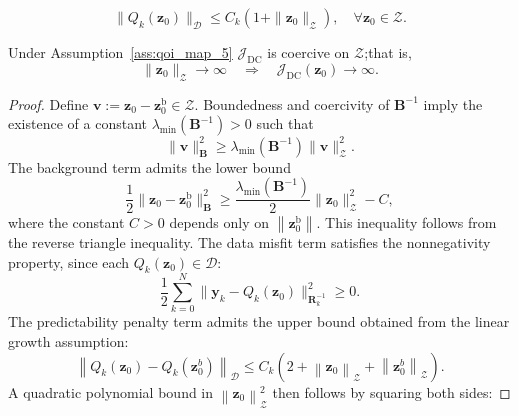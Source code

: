 \documentclass[10pt,a4paper]{amsart}
\begin{document}
\begin{equation}\label{ass:qoi_map_5}
\| Q_k(\mathbf{z}_0) \|_{\mathcal{D}} \leq C_k (1 + \| \mathbf{z}_0 \|_{\mathcal{Z}}), \quad \forall \mathbf{z}_0 \in \mathcal{Z}.
\end{equation}

\begin{lemma}\label{lemma:coercivity}
Under Assumption~\ref{ass:qoi_map_5} $\mathcal{J}_{\mathrm{DC}}$ is coercive on $\mathcal{Z}$;that is,
\begin{equation}
\| \mathbf{z}_0 \|_{\mathcal{Z}} \to \infty \quad \Rightarrow \quad \mathcal{J}_{\mathrm{DC}}(\mathbf{z}_0) \to \infty.
\end{equation}
\end{lemma}

\begin{proof}
Define $ \mathbf{v} := \mathbf{z}_0 - \mathbf{z}_0^{\mathrm{b}} \in \mathcal{Z} $. Boundedness and coercivity of $ \mathbf{B}^{-1} $ imply the existence of a constant $ \lambda_{\min}\left(\mathbf{B}^{-1}\right) > 0 $ such that
\begin{equation}
\| \mathbf{v} \|_{\mathbf{B}}^2 \geq \lambda_{\min}\left(\mathbf{B}^{-1}\right) \| \mathbf{v} \|_{\mathcal{Z}}^2.
\end{equation}
The background term admits the lower bound
\begin{equation}
\frac{1}{2} \| \mathbf{z}_0 - \mathbf{z}_0^{\mathrm{b}} \|_{\mathbf{B}}^2 \geq \frac{\lambda_{\min}\left(\mathbf{B}^{-1}\right)}{2} \| \mathbf{z}_0 \|_{\mathcal{Z}}^2 - C,
\end{equation}
where the constant $ C > 0 $ depends only on $ \left\| \mathbf{z}_0^{\mathrm{b}} \right\| $. This inequality follows from the reverse triangle inequality. The data misfit term satisfies the nonnegativity property, since each $ Q_k(\mathbf{z}_0) \in \mathcal{D} $:
\begin{equation}
\frac{1}{2} \sum_{k=0}^N \| \mathbf{y}_k - Q_k(\mathbf{z}_0) \|_{\mathbf{R}^{-1}_k}^2 \geq 0.
\end{equation}
The predictability penalty term admits the upper bound obtained from the linear growth assumption:
\begin{equation}
\left\|Q_k\left(\mathbf{z}_0\right)-Q_k\left(\mathbf{z}_0^b\right)\right\|_{\mathcal{D}} \leq C_k\left(2+\left\|\mathbf{z}_0\right\|_{\mathcal{Z}}+\left\|\mathbf{z}_0^b\right\|_{\mathcal{Z}}\right).
\end{equation}
A quadratic polynomial bound in $ \left\| \mathbf{z}_0 \right\|_{\mathcal{Z}}^2 $ then follows by squaring both sides:

\end{proof}
\end{document}
